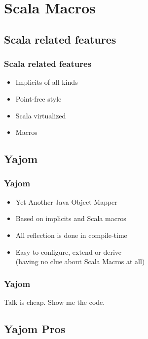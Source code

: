 \documentclass[14pt]{beamer}
\begin{document}
\section{Scala Macros}
\subsection{Scala related features}
\frame
{\frametitle{Scala related features}
\begin{itemize}
  \item Implicits of all kinds
  \item Point-free style
  \item Scala virtualized
  \item Macros
\end{itemize}
}

\subsection{Yajom}
\frame
{\frametitle{Yajom}
\begin{itemize}
  \item Yet Another Java Object Mapper
  \item Based on implicits and Scala macros
  \item All reflection is done in compile-time
  \item Easy to configure, extend or derive \\ (having no clue about Scala Macros at all)
\end{itemize}
}

\frame
{\frametitle{Yajom}
\begin{center}
  \large Talk is cheap. Show me the code.
\end{center}
}

\subsection{Yajom Pros}
\end{document}

